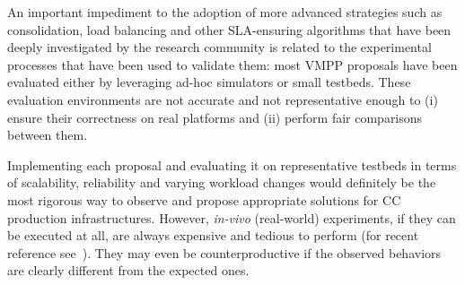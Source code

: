 An important impediment to the adoption of more advanced strategies
such as consolidation, load balancing and other SLA-ensuring
algorithms that have been deeply investigated by the research community
\cite{feller:ccgrid12, Hermenier:2009:ECM:1508293.1508300, 5715067,
  quesnel:cpe2012, 5328077, 5935254} is related to the experimental
processes that have been used to validate them: most VMPP proposals have
been evaluated either by leveraging ad-hoc simulators or small
testbeds. These evaluation environments are not accurate and not
representative enough to (i) ensure their correctness on real
platforms and (ii) perform fair comparisons between them.

Implementing each proposal and evaluating it on representative
testbeds in terms of scalability, reliability and varying workload
changes would definitely be the most rigorous way to observe and
propose appropriate solutions for CC production infrastructures.
However, \textit{in-vivo} (\ie real-world) experiments, if they can be
executed at all, are always expensive and tedious to perform (for
recent reference see~\cite{barker:pitfalls}). They may
even be counterproductive if the observed behaviors are clearly
different from the expected ones.

